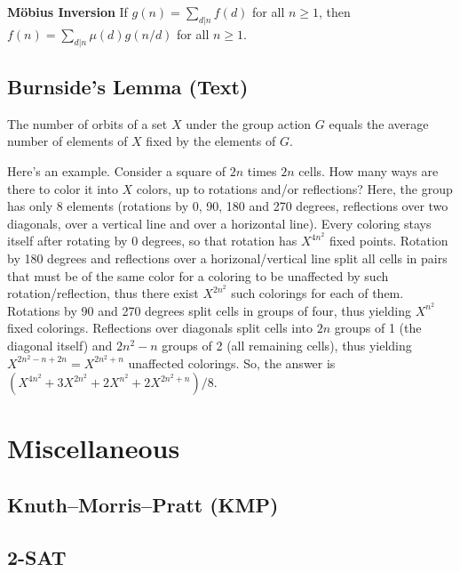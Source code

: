 \documentclass[10pt]{extarticle}
\begin{document}
\begin{multicols*}{3}
\textbf{M\"obius Inversion}
If $g(n) = \sum_{d|n} f(d)$ for all $n \ge 1$, then
$f(n) = \sum_{d|n} \mu(d)g(n/d)$ for all $n \ge 1$.

\subsection{Burnside's Lemma (Text)} %
The number of orbits of a set $X$ under the group action $G$ equals the average
number of elements of $X$ fixed by the elements of $G$.

Here's an example. Consider a square of $2n$ times $2n$ cells. How many ways
are there to color it into $X$ colors, up to rotations and/or reflections?
Here, the group has only 8 elements (rotations by 0, 90, 180 and 270 degrees,
reflections over two diagonals, over a vertical line and over a horizontal
line). Every coloring stays itself after rotating by 0 degrees, so that
rotation has $X^{4n^2}$ fixed points. Rotation by 180 degrees and reflections
over a horizonal/vertical line split all cells in pairs that must be of the
same color for a coloring to be unaffected by such rotation/reflection, thus
there exist $X^{2n^2}$ such colorings for each of them. Rotations by 90 and 270
degrees split cells in groups of four, thus yielding $X^{n^2}$ fixed colorings.
Reflections over diagonals split cells into $2n$ groups of 1 (the diagonal
itself) and $2n^2-n$ groups of 2 (all remaining cells), thus yielding
$X^{2n^2-n+2n}=X^{2n^2+n}$ unaffected colorings.  So, the answer is
$(X^{4n^2}+3X^{2n^2}+2X^{n^2}+2X^{2n^2+n})/8$.


\section{Miscellaneous}

\subsection{Knuth--Morris--Pratt (KMP)} %


\subsection{2-SAT} %



\end{multicols*}
\end{document}
